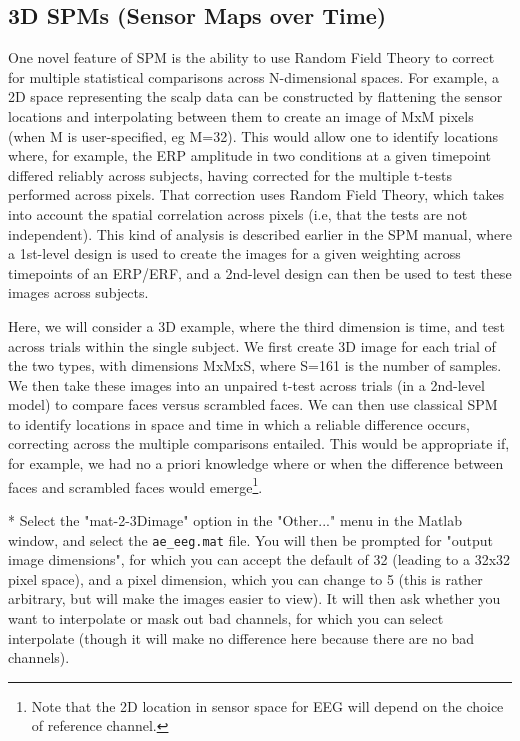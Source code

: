 \subsection{3D SPMs (Sensor Maps over Time) \label{3DSPM}}

One novel feature of SPM is the ability to use Random Field Theory to correct for multiple statistical comparisons across N-dimensional spaces. For example, a 2D space representing the scalp data can be constructed by flattening the sensor locations and interpolating between them to create an image of MxM pixels (when M is user-specified, eg M=32). This would allow one to identify locations where, for example, the ERP amplitude in two conditions at a given timepoint differed reliably across subjects, having corrected for the multiple t-tests performed across pixels. That correction uses Random Field Theory, which takes into account the spatial correlation across pixels (i.e, that the tests are not independent). This kind of analysis is described earlier in the SPM manual, where a 1st-level design is used to create the images for a given weighting across timepoints of an ERP/ERF, and a 2nd-level design can then be used to test these images across subjects.

Here, we will consider a 3D example, where the third dimension is time, and test across trials within the single subject. We first create 3D image for each trial of the two types, with dimensions MxMxS, where S=161 is the number of samples. We then take these images into an unpaired t-test across trials (in a 2nd-level model) to compare faces versus scrambled faces. We can then use classical SPM to identify locations in space and time in which a reliable difference occurs, correcting across the multiple comparisons entailed. This would be appropriate if, for example, we had no a priori knowledge where or when the difference between faces and scrambled faces would emerge\footnote{Note that the 2D location in sensor space for EEG will depend on the choice of reference channel.}.

* Select the "mat-2-3Dimage" option in the "Other..." menu in the Matlab window, and select the \verb!ae_eeg.mat! file. You will then be prompted for "output image dimensions", for which you can accept the default of 32 (leading to a 32x32 pixel space), and a pixel dimension, which you can change to 5 (this is rather arbitrary, but will make the images easier to view). It will then ask whether you want to interpolate or mask out bad channels, for which you can select interpolate (though it will make no difference here because there are no bad channels).

